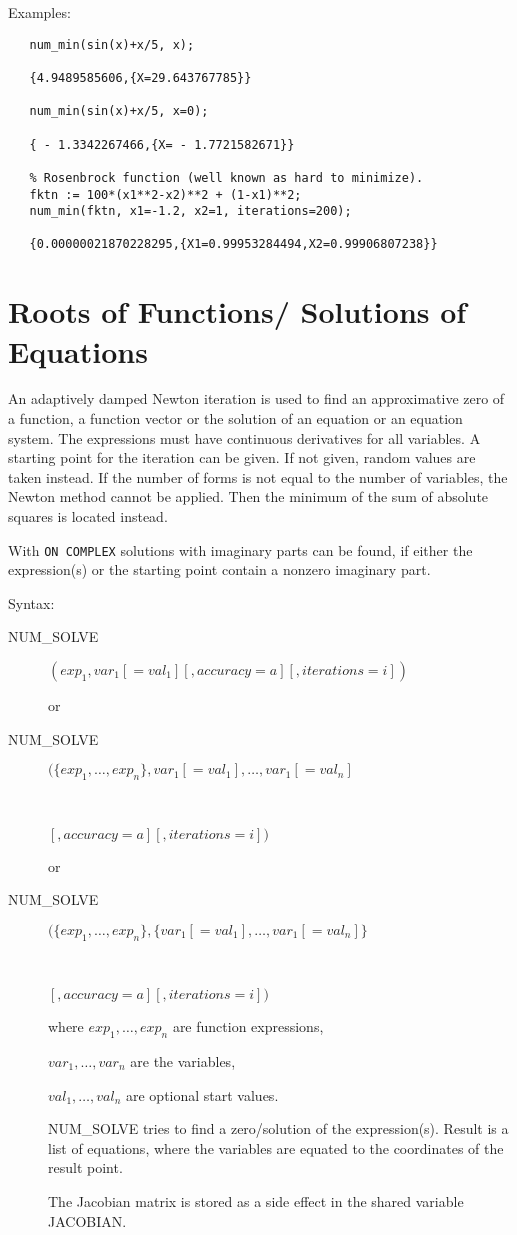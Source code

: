 Examples:

\begin{verbatim}
   num_min(sin(x)+x/5, x);

   {4.9489585606,{X=29.643767785}}

   num_min(sin(x)+x/5, x=0);

   { - 1.3342267466,{X= - 1.7721582671}}

   % Rosenbrock function (well known as hard to minimize).
   fktn := 100*(x1**2-x2)**2 + (1-x1)**2;
   num_min(fktn, x1=-1.2, x2=1, iterations=200);

   {0.00000021870228295,{X1=0.99953284494,X2=0.99906807238}}

\end{verbatim}

\section{Roots of Functions/ Solutions of Equations}

An adaptively damped Newton iteration is used to find an approximative
zero of a function, a function vector or the solution of an equation
or an equation system.  The expressions must have continuous
derivatives for all variables.  A starting point for the iteration can
be given. If not given, random values are taken instead. If the number
of forms is not equal to the number of variables, the Newton method
cannot be applied. Then the minimum of the sum of absolute squares is
located instead.

With {\tt ON COMPLEX} solutions with imaginary parts can be
found, if either the expression(s) or the starting point
contain a nonzero imaginary part.

Syntax:

\begin{description}
\item[NUM\_SOLVE]  $(exp_1, var_1[=val_1][,accuracy=a][,iterations=i])$

or

\item[NUM\_SOLVE]  $(\{exp_1,\ldots,exp_n\},
   var_1[=val_1],\ldots,var_1[=val_n]$
\item[\ \ \ \ \ \ \ \ ]$[,accuracy=a][,iterations=i])$

or

\item[NUM\_SOLVE]  $(\{exp_1,\ldots,exp_n\},
   \{var_1[=val_1],\ldots,var_1[=val_n]\}$
\item[\ \ \ \ \ \ \ \ ]$[,accuracy=a][,iterations=i])$

where $exp_1, \ldots,exp_n$ are function expressions,

      $var_1, \ldots, var_n$ are the variables,

      $val_1, \ldots, val_n$ are optional start values.

NUM\_SOLVE tries to find a zero/solution of the expression(s).
Result is a list of equations, where the variables are
equated to the coordinates of the result point.

The Jacobian matrix is stored as a side effect in the shared
variable JACOBIAN.

\end{description}

